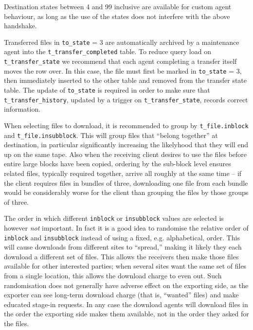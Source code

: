 \documentclass{cmspaper}
\begin{document}
Destination states between 4 and 99 inclusive are available for custom agent behaviour, as long as the use of the states does not interfere with the above handshake.

Transferred files in \texttt{to\_state} = 3 are automatically archived by a maintenance agent into the \texttt{t\_transfer\_completed} table.  To reduce query load on \texttt{t\_transfer\_state} we recommend that each agent completing a transfer itself moves the row over.  In this case, the file must first be marked in \texttt{to\_state} = 3, then immediately inserted to the other table and removed from the transfer state table.  The update of \texttt{to\_state} is required in order to make sure that \texttt{t\_transfer\_history}, updated by a trigger on \texttt{t\_transfer\_state}, records correct information.

When selecting files to download, it is recommended to group by \texttt{t\_file.inblock} and \texttt{t\_file.insubblock}.  This will group files that ``belong together'' at destination, in particular significantly increasing the likelyhood that they will end up on the same tape.  Also when the receiving client desires to use the files before entire large blocks have been copied, ordering by the sub-block level ensures related files, typically required together, arrive all roughly at the same time -- if the client requires files in bundles of three, downloading one file from each bundle would be considerably worse for the client than grouping the files by those groups of three.

The order in which different \texttt{inblock} or \texttt{insubblock} values are selected is however {\em not} important.  In fact it is a good idea to randomise the relative order of \texttt{inblock} and \texttt{insubblock} instead of using a fixed, e.g. alphabetical, order.  This will cause downloads from different sites to ``spread,'' making it likely they each download a different set of files.  This allows the receivers then make those files available for other interested parties; when several sites want the same set of files from a single location, this allows the download charge to even out.  Such randomisation does not generally have adverse effect on the exporting side, as the exporter can see long-term download charge (that is, ``wanted'' files) and make educated stage-in requests.  In any case the download agents will download files in the order the exporting side makes them available, not in the order they asked for the files.

\end{document}
